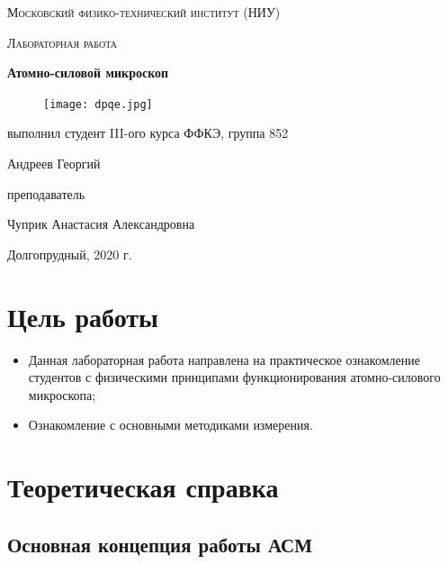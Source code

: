 \documentclass[a4paper]{article}
\begin{document}
\begin{titlepage}
\noindent

	\centering
	\vspace{2cm}
	{\scshape\LARGE Московский физико-технический институт (НИУ)\par}
	\vspace{1cm}
	{\scshape\Large Лабораторная работа\par}
	\vspace{1cm}
	{\huge\bfseries Атомно-силовой микроскоп\par}
	\vspace{1cm}
	
	\begin{figure}[H]
	\centering
	\texttt{[image: dpqe.jpg]}
   	\label{fig:0}
	\end{figure}
	\vfill
	
\begin{flushright}
	{\large выполнил студент III-ого курса ФФКЭ, группа 852}\par
	\vspace{0.3cm}
	{\LARGE Андреев Георгий} \par
	\vspace{0.3cm}
	{\large преподаватель}\par
	\vspace{0.3cm}
	{\LARGE Чуприк Анастасия Александровна} \par
\end{flushright}

\vfill

	Долгопрудный, 2020 г.
\end{titlepage}
\newpage
\tableofcontents
\newpage
\section{Цель работы}
\begin{itemize}
	\item Данная лабораторная работа направлена на практическое ознакомление студентов с физическими принципами функционирования атомно-силового микроскопа;
	\item Ознакомление с основными методиками измерения.
\end{itemize}


\section{Теоретическая справка}
\subsection{Основная концепция работы АСМ}
\end{document}
